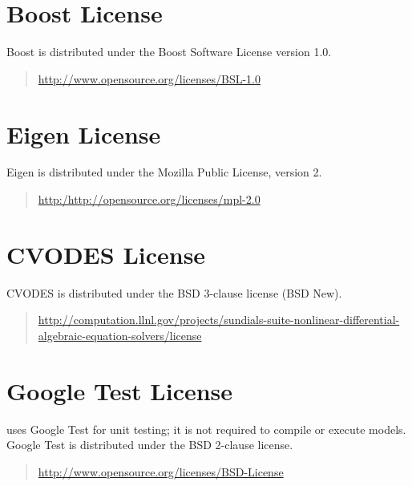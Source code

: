 \section{Boost License}

Boost is distributed under the Boost Software
License version 1.0.
%
\begin{quote}
\url{http://www.opensource.org/licenses/BSL-1.0}
\end{quote}

\section{Eigen License} 
%
Eigen is distributed under the Mozilla Public License,
version 2.
%
\begin{quote}
\url{http:/http://opensource.org/licenses/mpl-2.0}
\end{quote}

\section{CVODES License} 
%
CVODES is distributed under the BSD 3-clause license (BSD New).
%
\begin{quote}
\url{http://computation.llnl.gov/projects/sundials-suite-nonlinear-differential-algebraic-equation-solvers/license}
\end{quote}

\section{Google Test License}

\CmdStan uses Google Test for unit testing; it is not required to
compile or execute models.  Google Test is distributed under the BSD
2-clause license.
%
\begin{quote}
\url{http://www.opensource.org/licenses/BSD-License}
\end{quote}

